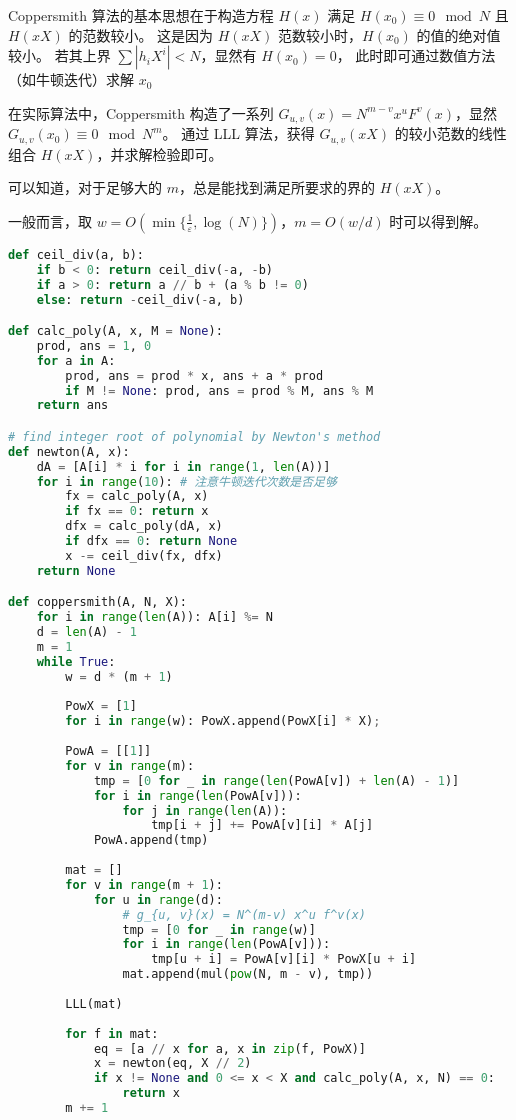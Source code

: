 \documentclass{ctexart}
\begin{document}
Coppersmith 算法的基本思想在于构造方程 $H(x)$ 满足 $H(x_0) \equiv 0 \mod N$ 且 $H(xX)$ 的范数较小。
这是因为 $H(xX)$ 范数较小时，$H(x_0)$ 的值的绝对值较小。
若其上界 $\sum{|h_iX^i|} < N$，显然有 $H(x_0) = 0$，
此时即可通过数值方法（如牛顿迭代）求解 $x_0$

在实际算法中，Coppersmith 构造了一系列 $G_{u, v}(x) = N^{m-v} x^u F^v(x)$，显然 $G_{u, v}(x_0) \equiv 0 \mod N^m$。
通过 LLL 算法，获得 $G_{u, v}(xX)$ 的较小范数的线性组合 $H(xX)$，并求解检验即可。

可以知道，对于足够大的 $m$，总是能找到满足所要求的界的 $H(xX)$。

一般而言，取 $w = O(\min\{\frac{1}{\varepsilon}, \log(N)\})$，$ m = O(w / d)$ 时可以得到解。

\begin{lstlisting}[language = Python]
def ceil_div(a, b):
    if b < 0: return ceil_div(-a, -b)
    if a > 0: return a // b + (a % b != 0)
    else: return -ceil_div(-a, b)

def calc_poly(A, x, M = None):
    prod, ans = 1, 0
    for a in A:
        prod, ans = prod * x, ans + a * prod
        if M != None: prod, ans = prod % M, ans % M
    return ans

# find integer root of polynomial by Newton's method
def newton(A, x):
    dA = [A[i] * i for i in range(1, len(A))]
    for i in range(10): # 注意牛顿迭代次数是否足够
        fx = calc_poly(A, x)
        if fx == 0: return x
        dfx = calc_poly(dA, x)
        if dfx == 0: return None
        x -= ceil_div(fx, dfx)
    return None

def coppersmith(A, N, X):
    for i in range(len(A)): A[i] %= N
    d = len(A) - 1
    m = 1
    while True:
        w = d * (m + 1)
        
        PowX = [1]
        for i in range(w): PowX.append(PowX[i] * X);
        
        PowA = [[1]]
        for v in range(m):
            tmp = [0 for _ in range(len(PowA[v]) + len(A) - 1)]
            for i in range(len(PowA[v])):
                for j in range(len(A)):
                    tmp[i + j] += PowA[v][i] * A[j]
            PowA.append(tmp)
        
        mat = []
        for v in range(m + 1):
            for u in range(d):
                # g_{u, v}(x) = N^(m-v) x^u f^v(x)
                tmp = [0 for _ in range(w)]
                for i in range(len(PowA[v])):
                    tmp[u + i] = PowA[v][i] * PowX[u + i]
                mat.append(mul(pow(N, m - v), tmp))
        
        LLL(mat)
                
        for f in mat:
            eq = [a // x for a, x in zip(f, PowX)]
            x = newton(eq, X // 2)
            if x != None and 0 <= x < X and calc_poly(A, x, N) == 0:
                return x
        m += 1
\end{lstlisting}
\end{document}
